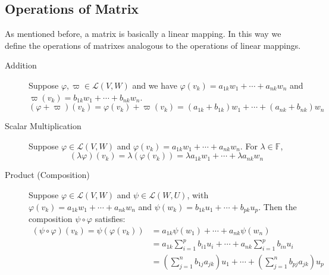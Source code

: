 \subsection{Operations of Matrix}
As mentioned before, a matrix is basically a linear mapping. In this way we define the operations of matrixes analogous to the operations of linear mappings.
\begin{description}
    \item[Addition] Suppose $\varphi,\varpi \in \mathcal{L}(V, W)$ and we have $\varphi \left(v_{k}\right)=a_{1 k} w_{1}+\cdots+a_{n k} w_{n}$ and $\varpi\left(v_{k}\right)=b_{1 k} w_{1}+\cdots+b_{n k} w_{n}$.
    $$(\varphi+\varpi)\left(v_{k}\right)=\varphi\left(v_{k}\right)+\varpi \left(v_{k}\right)=\left(a_{1 k}+b_{1 k}\right) w_{1}+\cdots+\left(a_{n k}+b_{n k}\right) w_{n}$$ 
    
    \item[Scalar Multiplication] Suppose $\varphi \in \mathcal{L}(V, W)$ and $\varphi\left(v_{k}\right)=a_{1 k} w_{1}+\cdots+a_{n k} w_{n}$. For $\lambda \in \mathbb{F}$,
    $$(\lambda \varphi)\left(v_{k}\right)=\lambda\left(\varphi\left(v_{k}\right)\right)=\lambda a_{1 k} w_{1}+\cdots+\lambda a_{n k} w_{n}$$
    
    \item[Product (Composition)] Suppose $\varphi \in \mathcal{L}(V, W)$ and $\psi \in \mathcal{L}(W, U)$, with $\varphi\left(v_{k}\right)=a_{1 k} w_{1}+\cdots+a_{n k} w_{n}$ and $\psi\left(w_{k}\right)=b_{1 k} u_{1}+\cdots+b_{p k} u_{p}$. Then the composition $\psi \circ \varphi$ satisfies:
    $$\begin{aligned}
    (\psi \circ \varphi)\left(v_{k}\right)=\psi\left(\varphi\left(v_{k}\right)\right) & =a_{1 k} \psi\left(w_{1}\right)+\cdots+a_{n k} \psi\left(w_{n}\right) \\
    & =a_{1 k} \sum_{i=1}^{p} b_{i 1} u_{i}+\cdots+a_{n k} \sum_{i=1}^{p} b_{i n} u_{i} \\
    & =\left(\sum_{j=1}^{n} b_{1 j} a_{j k}\right) u_{1}+\cdots+\left(\sum_{j=1}^{n} b_{p j} a_{j k}\right) u_{p}
    \end{aligned}$$
\end{description}


